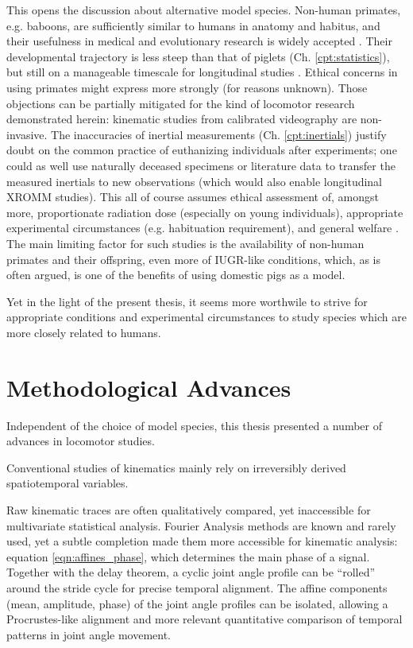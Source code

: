 This opens the discussion about alternative model species.
Non-human primates, e.g. baboons, are sufficiently similar to humans in anatomy and habitus, and their usefulness in medical and evolutionary research is widely accepted \citep{Nardone2017,Liang2023,Aerts2023b,Druelle2021,BoulinguezAmbroise2021}.
Their developmental trajectory is less steep than that of piglets (Ch. \ref{cpt:statistics}), but still on a manageable timescale for longitudinal studies \citep{Druelle2017}.
Ethical concerns in using primates might express more strongly (for reasons unknown).
Those objections can be partially mitigated for the kind of locomotor research demonstrated herein:
kinematic studies from calibrated videography are non-invasive.
The inaccuracies of inertial measurements (Ch. \ref{cpt:inertials}) justify doubt on the common practice of euthanizing individuals after experiments; one could as well use naturally deceased specimens or literature data to transfer the measured inertials to new observations (which would also enable longitudinal XROMM studies).
This all of course assumes ethical assessment of, amongst more, proportionate radiation dose (especially on young individuals), appropriate experimental circumstances (e.g. habituation requirement), and general welfare \citep{Young2018}.
The main limiting factor for such studies is the availability of non-human primates and their offspring, even more of IUGR-like conditions, which, as is often argued, is one of the benefits of using domestic pigs as a model.

Yet in the light of the present thesis, it seems more worthwile to strive for appropriate conditions and experimental circumstances to study species which are more closely related to humans.


\section{Methodological Advances}
\label{sec:org0782697}
Independent of the choice of model species, this thesis presented a number of advances in locomotor studies.


Conventional studies of kinematics mainly rely on irreversibly derived spatiotemporal variables.

Raw kinematic traces are often qualitatively compared, yet inaccessible for multivariate statistical analysis.
Fourier Analysis methods are known and rarely used, yet a subtle completion made them more accessible for kinematic analysis: equation \eqref{eqn:affines_phase}, which determines the main phase of a signal.
Together with the delay theorem, a cyclic joint angle profile can be ``rolled'' around the stride cycle for precise temporal alignment.
The affine components (mean, amplitude, phase) of the joint angle profiles can be isolated, allowing a Procrustes-like alignment and more relevant quantitative comparison of temporal patterns in joint angle movement.

